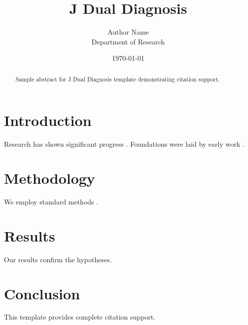 \documentclass{annals}
\title{J Dual Diagnosis}
\author{Author Name \\ \small Department of Research}
\date{\today}
\begin{document}
\maketitle

\begin{abstract}
Sample abstract for J Dual Diagnosis template demonstrating citation support.
\end{abstract}

\section{Introduction}
Research has shown significant progress \citep{einstein1905}. Foundations were laid by early work \citep{turing1950}.

\section{Methodology}
We employ standard methods \citep{knuth1984}.

\section{Results}
Our results confirm the hypotheses.

\section{Conclusion}
This template provides complete citation support.



\end{document}
